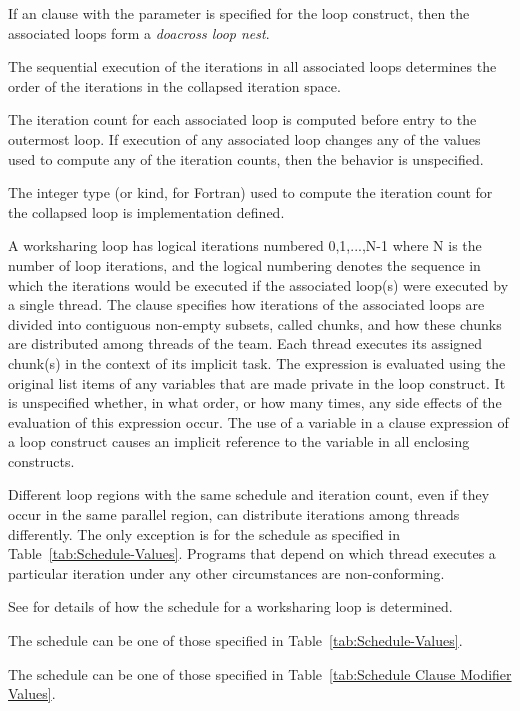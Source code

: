 If an  clause with the parameter is specified for the loop construct, then the associated loops form a \emph{doacross loop nest}. 

The sequential execution of the iterations in all 
associated loops determines the order of the iterations in the collapsed iteration space.

The iteration count for each associated loop is computed before entry to the outermost 
loop. If execution of any associated loop changes any of the values used to compute any 
of the iteration counts, then the behavior is unspecified.

The integer type (or kind, for Fortran) used to compute the iteration count for the 
collapsed loop is implementation defined.

A worksharing loop has logical iterations numbered 0,1,...,N-1 where N is the number of 
loop iterations, and the logical numbering denotes the sequence in which the iterations 
would be executed if the associated loop(s) were executed by a single thread. The 
 clause specifies how iterations of the associated loops are divided into 
contiguous non-empty subsets, called chunks, and how these chunks are distributed 
among threads of the team. Each thread executes its assigned chunk(s) in the context of 
its implicit task. The  expression is evaluated using the original list items of 
any variables that are made private in the loop construct. It is unspecified whether, in 
what order, or how many times, any side effects of the evaluation of this expression 
occur. The use of a variable in a  clause expression of a loop construct 
causes an implicit reference to the variable in all enclosing constructs.

Different loop regions with the same schedule and iteration count, even if they occur in 
the same parallel region, can distribute iterations among threads differently. The only 
exception is for the  schedule as specified in Table~\ref{tab:Schedule-Values}.
Programs that depend 
on which thread executes a particular iteration under any other circumstances are 
non-conforming. 

See  
for details of how the schedule for a worksharing loop is 
determined. 

The schedule  can be one of those specified in Table~\ref{tab:Schedule-Values}.

The schedule  can be one of those specified in Table~\ref{tab:Schedule Clause Modifier Values}.

